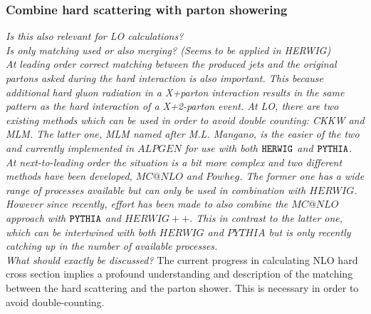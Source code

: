\subsubsection{Combine hard scattering with parton showering}
\textit{Is this also relevant for LO calculations?}\\
\textit{Is only matching used or also merging? (Seems to be applied in HERWIG)}\\

\textit{At leading order correct matching between the produced jets and the original partons asked during the hard interaction is also important. This because additional hard gluon radiation in a X+parton interaction results in the same pattern as the hard interaction of a X+2-parton event. At LO, there are two existing methods which can be used in order to avoid double counting: CKKW and MLM. The latter one, MLM named after M.L. Mangano, is the easier of the two and currently implemented in $ALPGEN$ for use with both $\texttt{HERWIG}$ and $\texttt{PYTHIA}$.\\
At next-to-leading order the situation is a bit more complex and two different methods have been developed, $MC@NLO$ and $Powheg$. The former one has a wide range of processes available but can only be used in combination with $HERWIG$. However since recently, effort has been made to also combine the $MC@NLO$ approach with $\texttt{PYTHIA}$ and $HERWIG++$. This in contrast to the latter one, which can be intertwined with both $HERWIG$ and $PYTHIA$ but is only recently catching up in the number of available processes.}\\

\textit{What should exactly be discussed?}
The current progress in calculating NLO hard cross section implies a profound understanding and description of the matching between the hard scattering and the parton shower. This is necessary in order to avoid double-counting.


